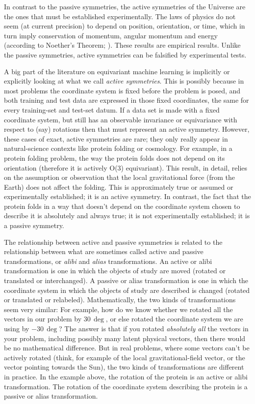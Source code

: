 \documentclass{article}
\theoremstyle{plain}
\theoremstyle{definition}
\theoremstyle{remark}
\begin{document}
In contrast to the passive symmetries, the active symmetries of the Universe are the ones that must be established experimentally.
The laws of physics do not seem (at current precision) to depend on position, orientation, or time, which in turn imply conservation of momentum, angular momentum and energy (according to Noether's Theorem; \citealt{noether}).
These results are empirical results.
Unlike the passive symmetries, active symmetries can be falsified by experimental tests.
 
A big part of the literature on equivariant machine learning is implicitly or explicitly looking at what we call \emph{active symmetries}.
This is possibly because in most problems the coordinate system is fixed before the problem is posed, and both training and test data are expressed in those fixed coordinates, the same for every training-set and test-set datum.
If a data set is made with a fixed coordinate system, but still has an observable invariance or equivariance with respect to (say) rotations then that must represent an active symmetry.
However, these cases of exact, active symmetries are rare; they only really appear in natural-science contexts like protein folding or cosmology.
For example, in a protein folding problem, the way the protein folds does not depend on its orientation (therefore it is actively O(3) equivariant).
This result, in detail, relies on the assumption or observation that the local gravitational force (from the Earth) does not affect the folding.
This is approximately true or assumed or experimentally established; it is an active symmetry.
In contrast, the fact that the protein folds in a way that doesn't depend on the coordinate system chosen to describe it is absolutely and always true; it is not experimentally established; it is a passive symmetry.

The relationship between active and passive symmetries is related to the relationship between what are sometimes called active and passive transformations, or \emph{alibi} and \emph{alias} transformations.
An active or alibi transformation is one in which the objects of study are moved (rotated or translated or interchanged).
A passive or alias transformation is one in which the coordinate system in which the objects of study are described is changed (rotated or translated or relabeled).
Mathematically, the two kinds of transformations seem very similar:
For example, how do we know whether we rotated all the vectors in our problem by $30\,\deg$, or else rotated the coordinate system we are using by $-30\,\deg$?
The answer is that if you rotated \emph{absolutely all} the vectors in your problem, including possibly many latent physical vectors, then there would be no mathematical difference.
But in real problems, where some vectors can't be actively rotated (think, for example of the local gravitational-field vector, or the vector pointing towards the Sun), the two kinds of transformations are different in practice.
In the example above, the rotation of the protein is an active or alibi transformation.
The rotation of the coordinate system describing the protein is a passive or alias transformation.
\end{document}
